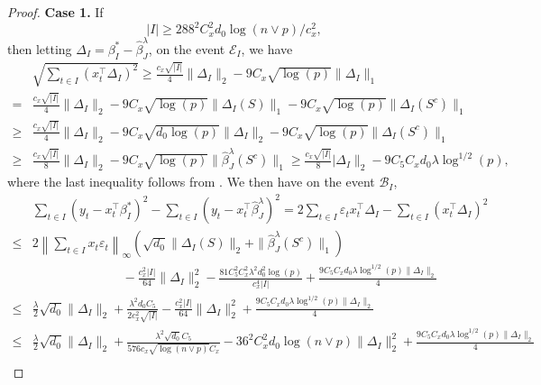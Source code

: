 \documentclass[twoside]{article}
\begin{document}
\begin{proof} 
 
 
\noindent \textbf{Case 1.} If 
	\begin{equation}\label{eq-lem16-i-cond} 
		|I| \geq  288^2 C^2_x d_0 \log(n \vee p)/c_x^2,		
	\end{equation}
	then letting $\Delta_I = \beta^*_I  -\widehat \beta^{\lambda}_J$, on the event $\mathcal{E}_I$, we have
	\begin{align}
		& \sqrt{\sum_{t \in I} (x_t^{\top} \Delta_I)^2} \geq \frac{c_x\sqrt{|I|}}{4} \|\Delta_I\|_2 - 9C_x\sqrt{\log(p)} \|\Delta_I\|_1 \nonumber \\
		= & \frac{c_x\sqrt{|I|}}{4} \|\Delta_I\|_2 - 9C_x\sqrt{\log(p)} \|\Delta_I(S)\|_1 - 9C_x\sqrt{\log(p)} \|\Delta_I(S^c)\|_1 \nonumber \\
		\geq & \frac{c_x\sqrt{|I|}}{4} \|\Delta_I\|_2 - 9C_x\sqrt{d_0\log(p)} \|\Delta_I\|_2 - 9C_x\sqrt{\log(p)} \|\Delta_I(S^c)\|_1 \nonumber \\
		\geq & \frac{c_x\sqrt{|I|}}{8} \|\Delta_I\|_2 - 9C_x\sqrt{\log(p)} \|\widehat{\beta}^{\lambda}_J(S^c)\|_1 \geq \frac{c_x\sqrt{|I|}}{8} |\Delta_I\|_2 - 9C_5 C_x d_0 \lambda\log^{1/2}(p), \label{eq-lem16-pf-1}
	\end{align} 
	where the last inequality follows from .  We then have on the event $\mathcal{B}_I$,
	\begin{align*}
	& \sum_{t \in I} (y_t - x_t^{\top} \beta^*_I)^2 - \sum_{t \in I} (y_t - x_t^{\top} \widehat{\beta}^{\lambda}_J)^2  = 2 \sum_{t \in I} \varepsilon_t x_t^{\top}\Delta_I  - \sum_{t \in I} (x_t^{\top}\Delta_I)^2 \\
	\leq & 2\left \|\sum_{t \in I }  x_t \varepsilon_t \right\|_{\infty }  \left( \sqrt {d_0} \| \Delta_I(S) \|_2  + \|\widehat \beta^{\lambda}_J (S^c) \|_1  \right) \\
	& \hspace{3cm} - \frac{c_x^2 |I|}{64}\|\Delta_I\|_2^2 - \frac{81C_5^2 C_x^2 \lambda^2 d_0^2\log(p)}{c_x^4 |I|} + \frac{9C_5C_xd_0\lambda \log^{1/2}(p) \|\Delta_I\|_2}{4}\\  
	\leq & \frac{\lambda}{2}\sqrt{d_0}\|\Delta_I\|_2 + \frac{\lambda^2 d_0 C_5}{2c_x^2 \sqrt{|I|}} - \frac{c_x^2 |I|}{64}\|\Delta_I\|_2^2 + \frac{9C_5C_xd_0\lambda \log^{1/2}(p) \|\Delta_I\|_2}{4} \\
	\leq & \frac{\lambda}{2}\sqrt{d_0}\|\Delta_I\|_2 + \frac{\lambda^2 \sqrt{d_0} C_5}{576c_x\sqrt{\log(n \vee p)}C_x} - 36^2C_x^2d_0\log(n \vee p)\|\Delta_I\|^2_2 + \frac{9C_5C_xd_0\lambda \log^{1/2}(p) \|\Delta_I\|_2}{4} \\

\end{align*}
\end{proof}
\end{document}
